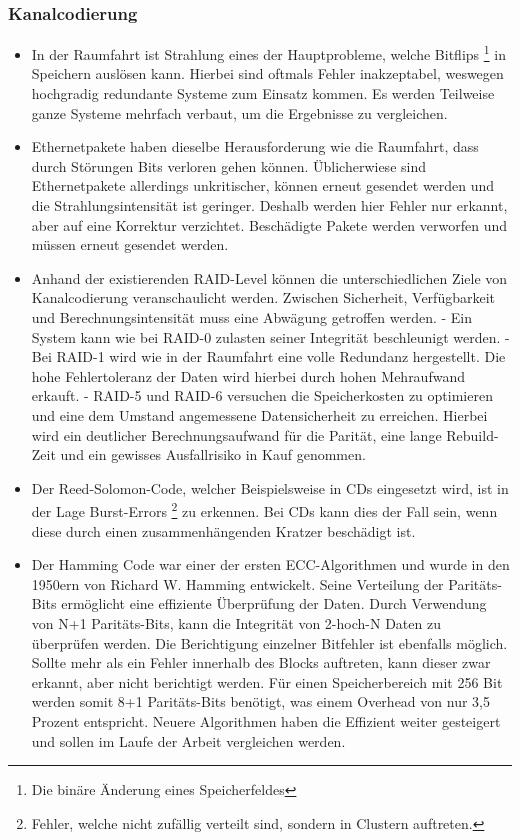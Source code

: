 \subsubsection{Kanalcodierung}
\begin{itemize}
	\item In der Raumfahrt ist Strahlung eines der Hauptprobleme, welche Bitflips
	\footnote{Die binäre Änderung eines Speicherfeldes}
	in Speichern auslösen kann.
	Hierbei sind oftmals Fehler inakzeptabel, weswegen hochgradig redundante Systeme zum Einsatz kommen.
	Es werden Teilweise ganze Systeme mehrfach verbaut, um die Ergebnisse zu vergleichen.
	\item Ethernetpakete haben dieselbe Herausforderung wie die Raumfahrt, dass durch Störungen Bits verloren gehen können.
	Üblicherwiese sind Ethernetpakete allerdings unkritischer, können erneut gesendet werden und die Strahlungsintensität ist geringer.
	Deshalb werden hier Fehler nur erkannt, aber auf eine Korrektur verzichtet.
	Beschädigte Pakete werden verworfen und müssen erneut gesendet werden.
	\item Anhand der existierenden RAID-Level können die unterschiedlichen Ziele von Kanalcodierung veranschaulicht werden.
	Zwischen Sicherheit, Verfügbarkeit und Berechnungsintensität muss eine Abwägung getroffen werden.
	- Ein System kann wie bei RAID-0 zulasten seiner Integrität beschleunigt werden.
	- Bei RAID-1 wird wie in der Raumfahrt eine volle Redundanz hergestellt. Die hohe Fehlertoleranz der Daten wird hierbei durch hohen Mehraufwand erkauft.
	- RAID-5 und RAID-6 versuchen die Speicherkosten zu optimieren und eine dem Umstand angemessene Datensicherheit zu erreichen. Hierbei wird ein deutlicher Berechnungsaufwand für die Parität, eine lange Rebuild-Zeit und ein gewisses Ausfallrisiko in Kauf genommen.
	\item Der Reed-Solomon-Code, welcher Beispielsweise in CDs eingesetzt wird, ist in der Lage Burst-Errors
	\footnote{Fehler, welche nicht zufällig verteilt sind, sondern in Clustern auftreten.}
	zu erkennen.
	Bei CDs kann dies der Fall sein, wenn diese durch einen zusammenhängenden Kratzer beschädigt ist.
	\item Der Hamming Code war einer der ersten ECC-Algorithmen und wurde in den 1950ern von Richard W. Hamming entwickelt.
	Seine Verteilung der Paritäts-Bits ermöglicht eine effiziente Überprüfung der Daten.
	Durch Verwendung von N+1 Paritäts-Bits, kann die Integrität von 2-hoch-N Daten zu überprüfen werden.
	Die Berichtigung einzelner Bitfehler ist ebenfalls möglich.
	Sollte mehr als ein Fehler innerhalb des Blocks auftreten, kann dieser zwar erkannt, aber nicht berichtigt werden.
	Für einen Speicherbereich mit 256 Bit werden somit 8+1 Paritäts-Bits benötigt, was einem Overhead von nur 3,5 Prozent entspricht.
	Neuere Algorithmen haben die Effizient weiter gesteigert und sollen im Laufe der Arbeit vergleichen werden.
\end{itemize}

